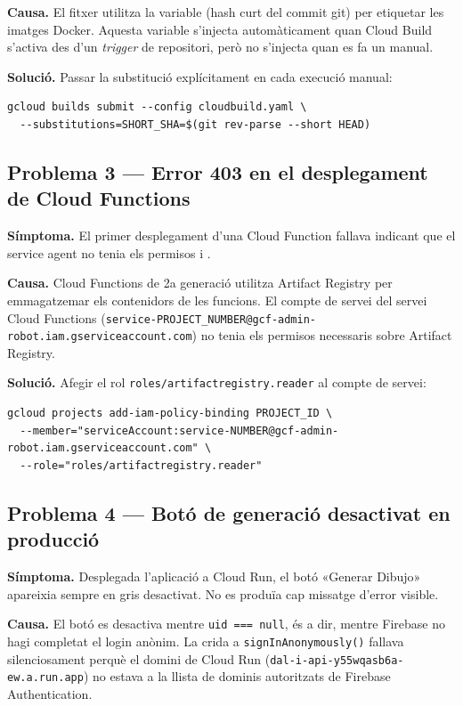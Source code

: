 \textbf{Causa.} El fitxer  utilitza la variable  (hash curt del commit git) per etiquetar les imatges Docker. Aquesta variable s'injecta automàticament quan Cloud Build s'activa des d'un \textit{trigger} de repositori, però no s'injecta quan es fa un  manual.

\textbf{Solució.} Passar la substitució explícitament en cada execució manual:
\begin{verbatim}
gcloud builds submit --config cloudbuild.yaml \
  --substitutions=SHORT_SHA=$(git rev-parse --short HEAD)
\end{verbatim}

\subsection*{Problema 3 — Error 403 en el desplegament de Cloud Functions}

\textbf{Símptoma.} El primer desplegament d'una Cloud Function fallava indicant que el service agent no tenia els permisos  i .

\textbf{Causa.} Cloud Functions de 2a generació utilitza Artifact Registry per emmagatzemar els contenidors de les funcions. El compte de servei del servei Cloud Functions (\texttt{service-PROJECT\_NUMBER@gcf-admin-robot.iam.gserviceaccount.com}) no tenia els permisos necessaris sobre Artifact Registry.

\textbf{Solució.} Afegir el rol \texttt{roles/artifactregistry.reader} al compte de servei:
\begin{verbatim}
gcloud projects add-iam-policy-binding PROJECT_ID \
  --member="serviceAccount:service-NUMBER@gcf-admin-robot.iam.gserviceaccount.com" \
  --role="roles/artifactregistry.reader"
\end{verbatim}

\subsection*{Problema 4 — Botó de generació desactivat en producció}

\textbf{Símptoma.} Desplegada l'aplicació a Cloud Run, el botó «Generar Dibujo» apareixia sempre en gris desactivat. No es produïa cap missatge d'error visible.

\textbf{Causa.} El botó es desactiva mentre \texttt{uid === null}, és a dir, mentre Firebase no hagi completat el login anònim. La crida a \texttt{signInAnonymously()} fallava silenciosament perquè el domini de Cloud Run (\texttt{dal-i-api-y55wqasb6a-ew.a.run.app}) no estava a la llista de dominis autoritzats de Firebase Authentication.

